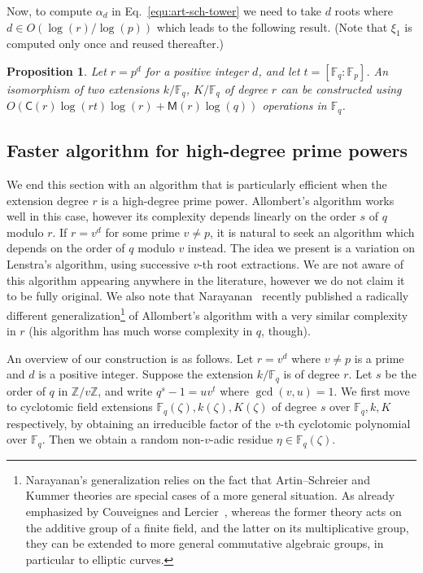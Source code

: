\documentclass[12pt]{article}
\theoremstyle{plain}
\newtheorem{proposition}[theorem]{Proposition}
\theoremstyle{definition}
\def\Z{\ensuremath{\mathbb{Z}}}
\def\F{\ensuremath{\mathbb{F}}}
\def\MM{\ensuremath{\mathsf{M}}}
\def\CC{\ensuremath{\mathsf{C}}}
\newcounter{algorithm}
\begin{document}
Now, to compute $\alpha_d$ in Eq.~\eqref{equ:art-sch-tower} we 
need to take $d$ roots where $d \in O(\log(r) / \log(p))$ which leads to the following result. (Note that $\xi_1$ is computed only once and reused thereafter.)

\begin{proposition}
	Let $r = p^d$ for a positive integer $d$, and let $t = [\F_q : \F_p]$. An isomorphism of two 
	extensions $k / \F_q$, $K / \F_q$ of degree $r$ can be constructed using 
	$O(\CC(r)\log(rt)\log(r) + \MM(r)\log(q))$ operations in $\F_q$.
\end{proposition}


\subsection{Faster algorithm for high-degree prime powers}
\label{sec:fast-algor-large}

We end this section with an algorithm that is particularly efficient when the extension 
degree $r$ is a high-degree prime power.
Allombert's algorithm works well in this case, however its
complexity depends linearly on the order $s$ of $q$ modulo $r$. If $r=v^d$ for some prime $v\ne p$,
it is natural to seek an algorithm which depends on the order of $q$ modulo $v$ instead.
The idea we present is a variation on Lenstra's algorithm, using successive $v$-th root
extractions.
We are not aware of this algorithm appearing anywhere in the literature, however we
do not claim it to be fully original. %
We also note that Narayanan~\cite[Sec.~5]{narayanan2016fast} recently
published a radically different generalization\footnote{Narayanan's
  generalization relies on the fact that Artin--Schreier and Kummer
  theories are special cases of a more general situation. %
  As already emphasized by Couveignes and Lercier~\cite{CL08}, whereas
  the former theory acts on the additive group of a finite field, and
  the latter on its multiplicative group, they can be extended to more
  general commutative algebraic groups, in particular to elliptic
  curves.} %
of Allombert's algorithm with a very similar complexity in $r$ (his
algorithm has much worse complexity in $q$, though).

An overview of our construction is as follows. Let $r = v^d$ where $v \ne p$ is a 
prime and $d$ is a positive integer. Suppose the extension $k/\F_q$ is of degree $r$. Let $s$ be 
the order of $q$ in $\Z / v\Z$, and write $q^s - 1 = uv^t$ where $\gcd(v, u) = 1$. We first move to 
cyclotomic field extensions $\F_q(\zeta), k(\zeta), K(\zeta)$ of degree $s$ over $\F_q, k, K$ respectively, by 
obtaining an irreducible factor of the $v$-th cyclotomic polynomial over $\F_q$. Then we obtain a  
random non-$v$-adic residue $\eta \in \F_q(\zeta)$.
\end{document}

